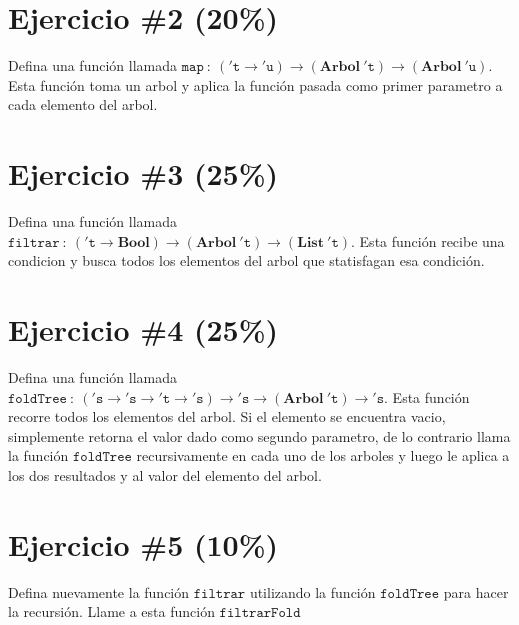 \documentclass{article}
\begin{document}
\section*{Ejercicio \#2 (20\%)}

Defina una funci\'on llamada $\mathtt{map}\ :\ (\mathtt{'t}\rightarrow\mathtt{'u})\rightarrow
(\mathbf{Arbol}\ \mathtt{'t}) \rightarrow (\mathbf{Arbol}\ \mathtt{'u})$. Esta funci\'on toma un arbol y aplica la funci\'on
pasada como primer parametro a cada elemento del arbol.

\section*{Ejercicio \#3 (25\%)}

Defina una funci\'on llamada $\mathtt{filtrar}\ :\ (\mathtt{'t}\rightarrow\mathbf{Bool})\rightarrow (\mathbf{Arbol}\ \mathtt{'t})
\rightarrow (\mathbf{List}\ \mathtt{'t})$. Esta funci\'on recibe una condicion y busca todos los elementos
del arbol que statisfagan esa condici\'on.

\section*{Ejercicio \#4 (25\%)}

Defina una funci\'on llamada $\mathtt{foldTree}\ :\ (\mathtt{'s}\rightarrow\mathtt{'s}
\rightarrow\mathtt{'t}\rightarrow\mathtt{'s})\rightarrow\mathtt{'s}\rightarrow(\mathbf{Arbol}\ \mathtt{'t})\rightarrow
\mathtt{'s}$.
Esta funci\'on recorre todos los elementos del arbol. Si el elemento se encuentra vacio,
simplemente retorna el valor dado como segundo parametro, de lo contrario llama la funci\'on
$\mathtt{foldTree}$ recursivamente en cada uno de los arboles y luego le aplica a los
dos resultados y al valor del elemento del arbol.

\section*{Ejercicio \#5 (10\%)}

Defina nuevamente la funci\'on $\mathtt{filtrar}$ utilizando la funci\'on $\mathtt{foldTree}$ para
hacer la recursi\'on. Llame a esta funci\'on $\mathtt{filtrarFold}$
\end{document}
